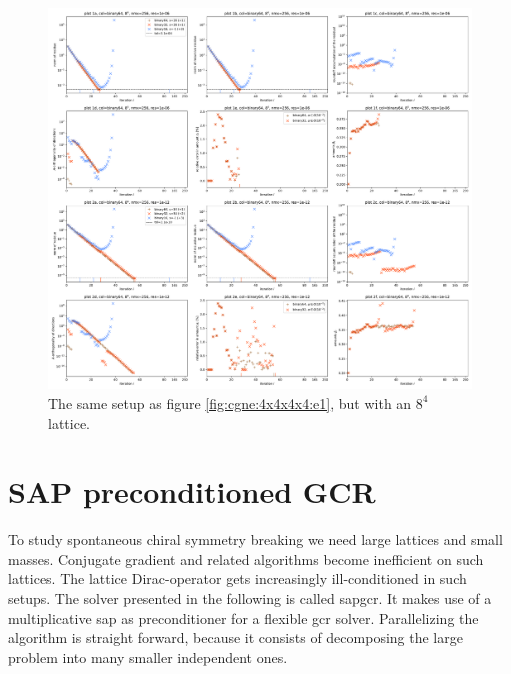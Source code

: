 \documentclass{article}
\theoremstyle{plain} %
\theoremstyle{convention} %
\theoremstyle{remark} %
\numberwithin{equation}{section}
\begin{document}
\begin{figure}[htbp]
    \centering
    \includegraphics[width=1.0\textwidth]{plots/cgne_8x8x8x8_e1}
    \caption{The same setup as figure \ref{fig:cgne:4x4x4x4:e1}, but with an $8^4$ lattice.}
    \label{fig:cgne:8x8x8x8:e1}
\end{figure}

\newpage

\section{SAP preconditioned GCR}

\label{sec:sap_gcr}

To study spontaneous chiral symmetry breaking we need large lattices and small masses. Conjugate gradient and related algorithms become inefficient on such lattices. The lattice Dirac-operator gets increasingly ill-conditioned in such setups. The solver presented in the following is called \acrshort{sapgcr}. It makes use of a multiplicative \acrfull{sap} as preconditioner for a flexible \acrfull{gcr} solver. Parallelizing the algorithm is straight forward, because it consists of decomposing the large problem into many smaller independent ones.
\end{document}

